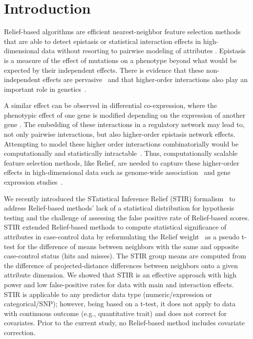 \documentclass[10pt]{article}
\begin{document}
\begin{abstract}
\end{abstract}

\linenumbers

\section{Introduction}

Relief-based algorithms are efficient nearest-neighbor feature selection methods that are able to detect epistasis or statistical interaction effects in high-dimensional data without resorting to pairwise modeling of attributes \cite{urbanowicz17b,kononenko97, mckinney09, rendell92}. Epistasis is a measure of the effect of mutations on a phenotype beyond what would be expected by their independent effects. There is evidence that these non-independent effects are pervasive~\cite{breen12} and that higher-order interactions also play an important role in genetics~\cite{weinreich13}. 

A similar effect can be observed in differential co-expression, where the phenotypic effect of one gene is modified depending on the expression of another gene \cite{lareau15,diffcoexp10}. The embedding of these interactions in a regulatory network may lead to, not only pairwise interactions, but also higher-order epistasis network effects. Attempting to model these higher order interactions combinatorially would be computationally and statistically intractable~\cite{riesselman18}. Thus, computationally scalable feature selection methods, like Relief, are needed to capture these higher-order effects in high-dimensional data such as genome-wide association~\cite{titv} and gene expression studies~\cite{stir}.

We recently introduced the STatistical Inference Relief (STIR) formalism~\cite{stir} to address Relief-based methods' lack of a statistical distribution for hypothesis testing and the challenge of assessing the false positive rate of Relief-based scores.
STIR extended Relief-based methods to compute statistical significance of attributes in case-control data by reformulating the Relief weight~\cite{mckinney13} as a pseudo t-test for the difference of means between neighbors with the same and opposite case-control status (hits and misses).
The STIR group means are computed from the difference of projected-distance differences between neighbors onto a given attribute dimension. We showed that STIR is an effective approach with high power and low false-positive rates for data with main and interaction effects. 
STIR is applicable to any predictor data type (numeric/expression or categorical/SNP); however, being based on a t-test, it does not apply to data with continuous outcome (e.g., quantitative trait) and does not correct for covariates.
Prior to the current study, no Relief-based method includes covariate correction.  
\end{document}
